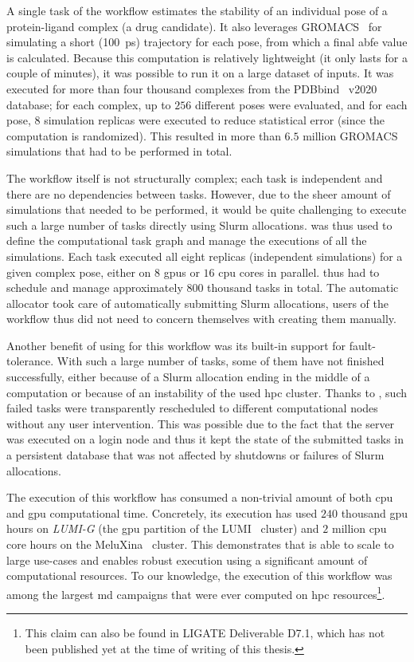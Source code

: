 A single task of the workflow estimates the stability of an individual pose of a protein-ligand
complex (a drug candidate). It also leverages GROMACS~\cite{gromacs} for simulating a
short (\SI{100}{\pico\second}) trajectory for each pose, from which a final
\gls{abfe} value is calculated. Because this computation is relatively lightweight (it
only lasts for a couple of minutes), it was possible to run it on a large dataset of inputs. It was
executed for more than four thousand complexes from the PDBbind~\cite{pdbbind} v2020
database; for each complex, up to $256$ different poses were evaluated, and for
each pose, $8$ simulation replicas were executed to reduce statistical error
(since the computation is randomized). This resulted in more than $6.5$ million
GROMACS simulations that had to be performed in total.

The workflow itself is not structurally complex; each task is independent and there are no
dependencies between tasks. However, due to the sheer amount of simulations that needed to be
performed, it would be quite challenging to execute such a large number of tasks directly using
Slurm allocations. \hyperqueue{} was thus used to define the computational task graph and
manage the executions of all the simulations. Each task executed all eight replicas (independent
simulations) for a given complex pose, either on $8$ \glspl{gpu} or
$16$ \gls{cpu} cores in parallel. \hyperqueue{} thus had
to schedule and manage approximately $800$ thousand tasks in total. The automatic
allocator took care of automatically submitting Slurm allocations, users of the workflow thus did
not need to concern themselves with creating them manually.

Another benefit of using \hyperqueue{} for this workflow was its built-in support for
fault-tolerance. With such a large number of tasks, some of them have not finished successfully,
either because of a Slurm allocation ending in the middle of a computation or because of an
instability of the used \gls{hpc} cluster. Thanks to \hyperqueue{}, such
failed tasks were transparently rescheduled to different computational nodes without any user
intervention. This was possible due to the fact that the \hq{} server was
executed on a login node and thus it kept the state of the submitted tasks in a persistent database
that was not affected by shutdowns or failures of Slurm allocations.

The execution of this workflow has consumed a non-trivial amount of both \gls{cpu}
and \gls{gpu} computational time. Concretely, its execution has used
$240$ thousand \gls{gpu} hours on \emph{LUMI-G}
(the \gls{gpu} partition of the LUMI~\cite{lumi} cluster) and
$2$ million \gls{cpu} core hours on the
MeluXina~\cite{meluxina} cluster. This demonstrates that \hyperqueue{} is able to
scale to large use-cases and enables robust execution using a significant amount of computational
resources. To our knowledge, the execution of this workflow was among the largest
\gls{md} campaigns that were ever computed on \gls{hpc}
resources\footnote{This claim can also be found in LIGATE Deliverable D7.1, which has not been published yet at the time of writing of this thesis.}.

